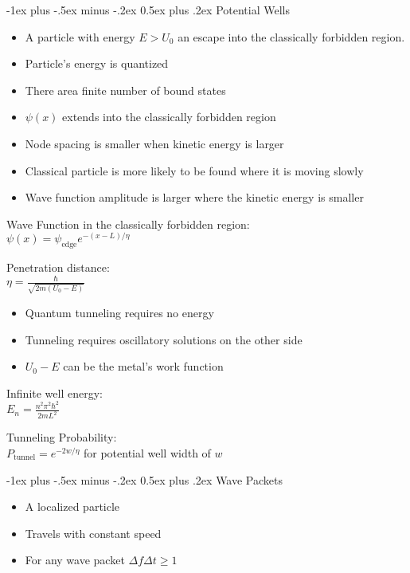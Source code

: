 \documentclass[12pt,landscape]{article}
\makeatletter
\renewcommand{\section}{\@startsection{section}{1}{0mm}%
	{-1ex plus -.5ex minus -.2ex}%
	{0.5ex plus .2ex}%
	{\normalfont\large\bfseries}}
\newcommand{\tab}{\hspace{.02\textwidth}}
\newcommand{\ds}{\displaystyle}
\makeatother
\begin{document}
\begin{multicols}{3}
\section{Potential Wells}
	\begin{itemize}[leftmargin=0.5cm]
		\itemsep0em
		\item A particle with energy $E > U_0$ an escape into the classically forbidden region.
		\item Particle's energy is quantized
		\item There area finite number of bound states
		\item $\psi (x)$ extends into the classically forbidden region
		\item Node spacing is smaller when kinetic energy is larger
		\item Classical particle is more likely to be found where it is moving slowly
		\item Wave function amplitude is larger where the kinetic energy is smaller
	\end{itemize}
	Wave Function in the classically forbidden region:\\
	\tab $\psi (x) = \psi_{\text{edge}} e^{-(x-L)/\eta}$
	
	Penetration distance:\\
	\tab $\ds \eta = \frac{\hbar}{\sqrt{2m(U_0 - E)}}$
	
	\begin{itemize}[leftmargin=0.5cm]
		\itemsep0em
		\item Quantum tunneling requires no energy
		\item Tunneling requires oscillatory solutions on the other side
		\item $U_0 - E$ can be the metal's work function
	\end{itemize}

	Infinite well energy:\\
	\tab $\ds E_n =\frac{n^2 \pi^2 \hbar^2}{2mL^2}$

	Tunneling Probability:\\
	\tab $P_{\text{tunnel}} = e^{-2w/\eta}$ for potential well width of $w$
	
\section{Wave Packets}
	\begin{itemize}[leftmargin=0.5cm]
		\itemsep0em
		\item A localized particle
		\item Travels with constant speed
		\item For any wave packet $\Delta f \Delta t \geq 1$
	\end{itemize}


\end{multicols}
\end{document}
